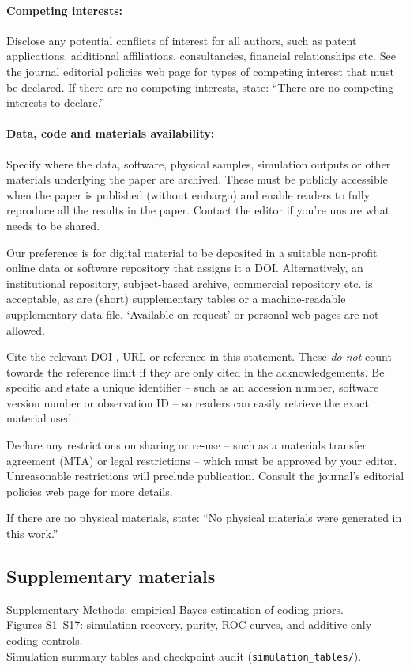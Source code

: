 \documentclass[12pt]{article}
\begin{document}
\paragraph*{Competing interests:}
Disclose any potential conflicts of interest for all authors, such as patent applications,
additional affiliations, consultancies, financial relationships etc.
See the journal editorial policies web page for types of competing interest that must be declared.
If there are no competing interests, state:
``There are no competing interests to declare.''
\paragraph*{Data, code and materials availability:}
Specify where the data, software, physical samples, simulation outputs or other materials
underlying the paper are archived.
These must be publicly accessible when the paper is published (without embargo) and enable
readers to fully reproduce all the results in the paper.
Contact the editor if you’re unsure what needs to be shared.

Our preference is for digital material to be deposited in a suitable non-profit online data or
software repository that assigns it a DOI.
Alternatively, an institutional repository, subject-based archive, commercial repository etc.
is acceptable, as are (short) supplementary tables or a machine-readable supplementary data file.
`Available on request’ or personal web pages are not allowed.

Cite the relevant DOI \cite{dataset}, URL \cite{example_url} or reference \cite{example2}
in this statement.
These \textit{do not} count towards the reference limit if they are only cited in the acknowledgements.
Be specific and state a unique identifier -- such as an accession number, software version number
or observation ID -- so readers can easily retrieve the exact material used.

Declare any restrictions on sharing or re-use -- such as a materials transfer agreement (MTA) or
legal restrictions -- which must be approved by your editor.
Unreasonable restrictions will preclude publication.
Consult the journal's editorial policies web page for more details.

If there are no physical materials, state:
``No physical materials were generated in this work.''


\subsection*{Supplementary materials}
Supplementary Methods: empirical Bayes estimation of coding priors.\\
Figures S1--S17: simulation recovery, purity, ROC curves, and additive-only coding controls.\\
Simulation summary tables and checkpoint audit (\texttt{simulation\_tables/}).
\end{document}
